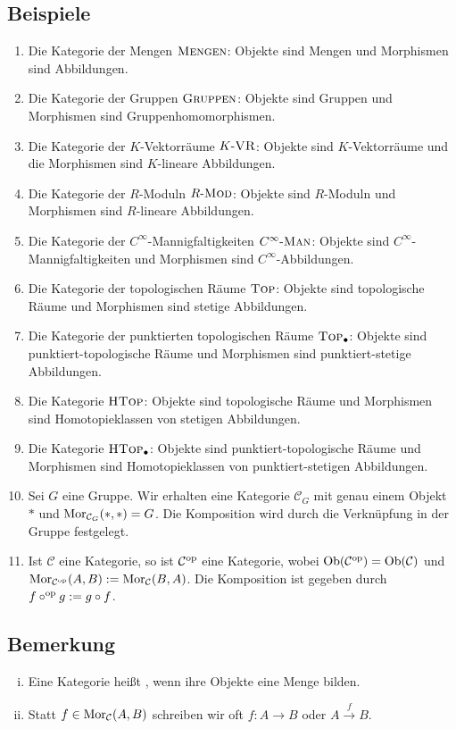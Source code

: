 \subsection[Beispiele für Kategorien]{Beispiele} %
\label{sub:12}
\begin{enumerate}[(1)]
	\item Die Kategorie der Mengen $\textsc{Mengen}$: Objekte sind Mengen und Morphismen sind Abbildungen.
	\item Die Kategorie der Gruppen $\textsc{Gruppen}$: Objekte sind Gruppen und Morphismen sind Gruppenhomomorphismen.
	\item Die Kategorie der $K$-Vektorräume $K\text{-}\textsc{VR}$: Objekte sind $K$-Vektorräume und die Morphismen sind $K$-lineare Abbildungen.
	\item Die Kategorie der $R$-Moduln $R\text{-}\textsc{Mod}$: Objekte sind $R$-Moduln und Morphismen sind $R$-lineare Abbildungen.
	\item Die Kategorie der $C^\infty$-Mannigfaltigkeiten $C^\infty\text{-}\textsc{Man}$: Objekte sind $C^\infty$-Mannigfaltigkeiten und Morphismen sind $C^\infty$-Abbildungen.
	\item Die Kategorie der topologischen Räume $\textsc{Top}$: Objekte sind topologische Räume und Morphismen sind stetige Abbildungen.
	\item Die Kategorie der punktierten topologischen Räume $\textsc{Top}_\bullet$: Objekte sind punktiert-topologische Räume und Morphismen sind punktiert-stetige Abbildungen.
	\item Die Kategorie $\textsc{HTop}$: Objekte sind topologische Räume und Morphismen sind Homotopieklassen von stetigen Abbildungen.
	\item Die Kategorie $\textsc{HTop}_\bullet$: Objekte sind punktiert-topologische Räume und Morphismen sind Homotopieklassen von punktiert-stetigen Abbildungen.
	\item Sei $G$ eine Gruppe. Wir erhalten eine Kategorie $\mathcal{C}_G$ mit genau einem Objekt $*$ und $\operatorname{Mor}_{\mathcal{C}_G}(*,*) = G$. Die Komposition wird durch die
	Verknüpfung in der Gruppe festgelegt.
	\item Ist $\mathcal{C}$ eine Kategorie, so ist $\mathcal{C}^{\mathrm{op}}$ eine Kategorie, wobei $\operatorname{Ob}(\mathcal{C}^{\mathrm{op}}) = \operatorname{Ob}(\mathcal{C})$ und 
	\(
		\operatorname{Mor}_{\mathcal{C}^{\mathrm{op}}}(A,B) := \operatorname{Mor}_\mathcal{C}(B,A)
	\).
	Die Komposition ist gegeben durch $f \circ^{\mathrm{op}} g := g \circ f$.
\end{enumerate}

\subsection[Bemerkungen zu Kategorien]{Bemerkung} %
\label{sub:13}
\begin{enumerate}[(i)]
	\item Eine Kategorie heißt , wenn ihre Objekte eine Menge bilden.
	\item Statt $f \in \operatorname{Mor}_\mathcal{C}(A,B)$ schreiben wir oft $f : A \to B$ oder $A \xrightarrow{f} B$.
\end{enumerate}

